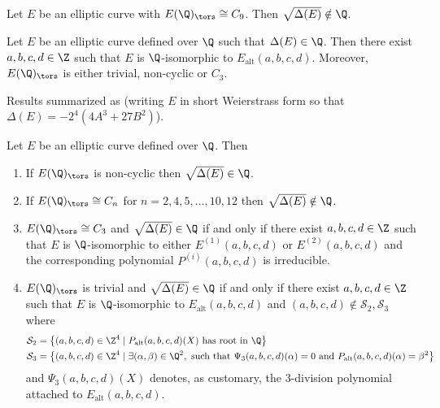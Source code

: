 \begin{prop} %
Let $E$ be an elliptic curve with $E(\Q)_\tors \cong C_9$. Then $\sqrt{\Delta(E)} \notin \Q$. 
\end{prop}


\begin{prop} %
Let $E$ be an elliptic curve defined over $\Q$ such that $\Delta(E) \in \Q$. Then there exist $a,b,c,d \in \Z$ such that $E$ is $\Q$-isomorphic to $E_{\text{alt}}(a,b,c,d)$. Moreover, $E(\Q)_\tors$ is either trivial, non-cyclic or $C_3$. 
\end{prop}


Results summarized as (writing $E$ in short Weierstrass form so that $\Delta(E)= -2^4(4A^3 + 27B^2)$). 


\begin{thm} %
Let $E$ be an elliptic curve defined over $\Q$. Then
	\begin{enumerate}[(1)]
	\item If $E(\Q)_\tors$ is non-cyclic then $\sqrt{\Delta(E)} \in \Q$. 
	\item If $E(\Q)_\tors \cong C_n$ for $n= 2,4,5,\ldots,10,12$ then $\sqrt{\Delta(E)} \notin \Q$.
	\item $E(\Q)_\tors \cong C_3$ and $\sqrt{\Delta(E)} \in \Q$ if and only if there exist $a,b,c,d \in \Z$ such that $E$ is $\Q$-isomorphic to either $E^{(1)}(a,b,c,d)$ or $E^{(2)}(a,b,c,d)$ and the corresponding polynomial $P^{(i)}(a,b,c,d)$ is irreducible. 
	\item $E(\Q)_\tors$ is trivial and $\sqrt{\Delta(E)} \in \Q$ if and only if there exist $a,b,c,d \in \Z$ such that $E$ is $\Q$-isomorphic to $E_{\text{alt}}(a,b,c,d)$ and $(a,b,c,d) \notin \mathcal{S}_2, \mathcal{S}_3$ where
		\[
		\begin{aligned}
		\mathcal{S}_2&= \left\{ (a,b,c,d) \in \Z^4 \;|\; P_{\text{alt}}(a,b,c,d)(X) \text{ has root in } \Q \right\} \\
		\mathcal{S}_3&= \left\{ (a,b,c,d) \in \Z^4 \;|\; \exists(\alpha,\beta) \in \Q^2, \text{ such that } \Psi_3(a,b,c,d)(\alpha)= 0 \text{ and } P_{\text{alt}}(a,b,c,d)(\alpha)= \beta^2 \right\}
		\end{aligned}
		\]
	and $\Psi_3(a,b,c,d)(X)$ denotes, as customary, the 3-division polynomial attached to $E_{\text{alt}}(a,b,c,d)$. 
	\end{enumerate}
\end{thm}



